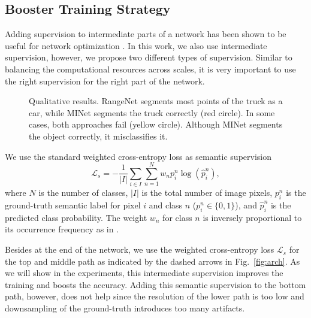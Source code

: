 \documentclass[letterpaper, 10 pt, journal, twoside]{ieeetran}
\newcommand{\figref}[1]{Fig.~\ref{#1}}
\begin{document}
\subsection{Booster Training Strategy}\label{sec:super}
Adding supervision to intermediate parts of a network \cite{lee2015deeply} has been shown to be useful for network optimization \cite{zhao2017pyramid,zhang2018context,liu2019richer,liu2018semantic}. In this work, we also use intermediate supervision, however, we propose two different types of supervision. Similar to balancing the computational resources across scales, it is very important to use the right supervision for the right part of the network.        


\begin{figure*}[!t]
    \centering
     \hspace{1mm}
     \hspace{1mm}
     \hspace{1mm}
     \hspace{1mm}
    \caption{Qualitative results.
    RangeNet segments most points of the truck as a car, 
    while MINet segments the truck correctly (red circle). 
    In some cases, both approaches fail (yellow circle). 
    Although MINet segments the object correctly, it misclassifies it.}
    \label{fig:vis_3d}
    \vspace{-6mm}
\end{figure*}

We use the standard weighted cross-entropy loss as semantic supervision
\begin{equation}\label{eq:S}
    \mathcal{L}_s = -\frac{1}{|I|}\sum_{i\in I}\sum_{n=1}^{N}w_n p_i^n \log(\hat{p}_i^n),
\end{equation}
where $N$ is the number of classes, $|I|$ is the total number of image pixels, $p_i^n$ is the ground-truth semantic label for pixel $i$ and class $n$ ($p_i^n \in \{0,1\}$), and $\hat{p}_i^n$ is the predicted class probability. The weight $w_n$ for class $n$ is inversely proportional to its occurrence frequency as in \cite{milioto2019rangenet++}.

Besides at the end of the network, we use the weighted cross-entropy loss $\mathcal{L}_{s}$ for the top and middle path as indicated by the dashed arrows in \figref{fig:arch}. As we will show in the experiments, this intermediate supervision improves the training and boosts the accuracy. Adding this semantic supervision to the bottom path, however, does not help since the resolution of the lower path is too low and downsampling of the ground-truth introduces too many artifacts.      
\end{document}
